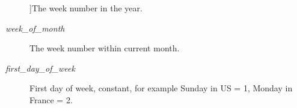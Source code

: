 \begin{Desc}
\begin{description}
{}]The week number in the year. \item[{\em 
week\+\_\+of\+\_\+month\label{namespacebooster_1_1locale_1_1period_1_1marks_a088e16937a13070e5545d25feaca4a65a57459eb7e4b32875b591de007c6dc550}
}]The week number within current month. \item[{\em 
first\+\_\+day\+\_\+of\+\_\+week\label{namespacebooster_1_1locale_1_1period_1_1marks_a088e16937a13070e5545d25feaca4a65a92ce727c44be13f02f9f9f21637ef939}
}]First day of week, constant, for example Sunday in US = 1, Monday in France = 2. \end{description}
\end{Desc}
